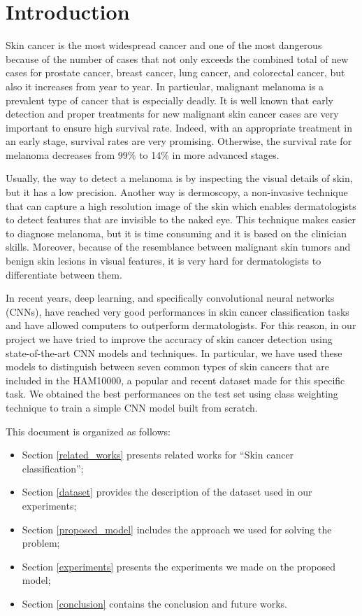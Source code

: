 \section{Introduction} \label{introduction}

	Skin cancer is the most widespread cancer and one of the most dangerous because of the number of cases that not only exceeds the combined total of new cases for prostate cancer, breast cancer, lung cancer, and colorectal cancer, but also it increases from year to year. In particular, malignant melanoma is a prevalent type of cancer that is especially deadly. It is well known that early detection and proper treatments for new malignant skin cancer cases are very important to ensure high survival rate. Indeed, with an appropriate treatment in an early stage, survival rates are very promising. Otherwise, the survival rate for melanoma decreases from 99\% to 14\% in more advanced stages.
	
	\smallskip
	
	Usually, the way to detect a melanoma is by inspecting the visual details of skin, but it has a low precision. Another way is dermoscopy, a non-invasive technique that can capture a high resolution image of the skin which enables dermatologists to detect features that are invisible to the naked eye. This technique makes easier to diagnose melanoma, but it is time consuming and it is based on the clinician skills. Moreover, because of the resemblance between malignant skin tumors and benign skin lesions in visual features, it is very hard for dermatologists to differentiate between them.
	
	\smallskip
	
	In recent years, deep learning, and specifically convolutional neural networks (CNNs), have reached very good performances in skin cancer classification tasks and have allowed computers to outperform dermatologists. For this reason, in our project we have tried to improve the accuracy of skin cancer detection using state-of-the-art CNN models and techniques. In particular, we have used these models to distinguish between seven common types of skin cancers that are included in the HAM10000, a popular and recent dataset made for this specific task. We obtained the best performances on the test set using class weighting technique to train a simple CNN model built from scratch. 
	
	\bigskip
	
	This document is organized as follows:  
	\begin{itemize}
		\item Section \ref{related_works} presents related works for ``Skin cancer classification'';
		\item Section \ref{dataset} provides the description of the dataset used in our experiments;
		\item Section \ref{proposed_model} includes the approach we used for solving the problem;
		\item Section \ref{experiments} presents the experiments we made on the proposed model;
		\item Section \ref{conclusion} contains the conclusion and future works.
	\end{itemize}